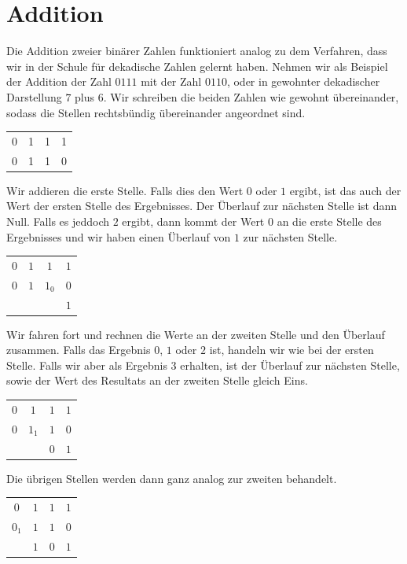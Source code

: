 \documentclass[11pt,a4paper,leqno]{report}
\numberwithin{equation}{chapter}
\begin{document}
\section{Addition}
Die Addition zweier bin\"arer Zahlen funktioniert analog zu dem Verfahren, dass wir in der Schule f\"ur dekadische Zahlen gelernt haben. Nehmen wir als Beispiel der Addition der Zahl $0111$ mit der Zahl $0110$, oder in gewohnter dekadischer Darstellung $7$ plus $6$.
Wir schreiben die beiden Zahlen wie gewohnt \"ubereinander, sodass die Stellen rechtsb\"undig \"ubereinander angeordnet sind.
\begin{center}
	\begin{tabular}{c c c c}
		0 & 1 & 1 & 1\\
		0 & 1 & 1 & 0\\
		\hline
	\end{tabular}  
\end{center}
Wir addieren die erste Stelle. Falls dies den Wert $0$ oder $1$ ergibt, ist das auch der Wert der ersten Stelle des Ergebnisses. Der \"Uberlauf zur n\"achsten Stelle ist dann Null. Falls es jeddoch $2$ ergibt, dann kommt der Wert $0$ an die erste Stelle des Ergebnisses und wir haben einen \"Uberlauf von $1$ zur n\"achsten Stelle.  
\begin{center}
	\begin{tabular}{c c c c}
		$0$ & $1$ & $1$ & $1$\\
		$0$ & $1$ & $1_0$ & $0$\\
		\hline
		 & &  & $1$\\
	\end{tabular}  
\end{center}
Wir fahren fort und rechnen die Werte an der zweiten Stelle und den \"Uberlauf zusammen. Falls das Ergebnis $0$, $1$ oder $2$ ist, handeln wir wie bei der ersten Stelle. Falls wir aber als Ergebnis $3$ erhalten, ist der \"Uberlauf zur n\"achsten Stelle, sowie der Wert des Resultats an der zweiten Stelle gleich Eins.  
\begin{center}
	\begin{tabular}{c c c c}
		$0$ & $1$ & $1$ & $1$\\
		$0$ & $1_1$ & $1$ & $0$\\
		\hline
		& & $0$ & $1$\\
	\end{tabular}  
\end{center}
Die \"ubrigen Stellen werden dann ganz analog zur zweiten behandelt.
\begin{center}
	\begin{tabular}{c c c c}
		$0$ & $1$ & $1$ & $1$\\
		$0_1$ & $1$ & $1$ & $0$\\
		\hline
		& $1$ & $0$ & $1$\\
	\end{tabular}  
\end{center}
\end{document}
